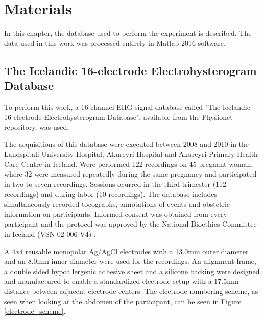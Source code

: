 \documentclass[bioengineering,article,submit,moreauthors,pdftex,10pt,a4paper]{mdpi}
\begin{document}
\section{Materials}

In this chapter, the database used to perform the experiment is described. The data used in this work was processed entirely in Matlab 2016 software.

\subsection{The Icelandic 16-electrode Electrohysterogram Database}

To perform this work, a 16-channel EHG signal database called "The Icelandic 16-electrode Electrohysterogram Database", available from the Physionet repository, was used.

The acquisitions of this database were executed between 2008 and 2010 in the Landspitali University Hospital, Akureyri Hospital and Akureyri Primary Health Care Centre in Iceland. Were performed 122 recordings on 45 pregnant woman, where 32 were measured repeatedly during the same pregnancy and participated in two to seven recordings. Sessions ocurred in the third trimester (112 recordings) and during labor (10 recordings). The database includes simultaneously recorded tocographs, annotations of events and obstetric information on participants. Informed consent was obtained from every participant and the protocol was approved by the National Bioethics Committee in Iceland (VSN 02-006-V4) \cite{ref-islddatabase}.

A $4x4$ reusable monopolar Ag/AgCl electrodes with a 13.0mm outer diameter and an 8.0mm inner diameter were used for the recordings. An alignment frame, a double sided hypoallergenic adhesive sheet and a silicone backing were designed and manufactured to enable a standardized electrode setup with a 17.5mm distance between adjacent electrode centers. The electrode numbering scheme, as seen when looking at the abdomen of the participant, can be seen in Figure \ref{electrode_scheme}.
\end{document}
